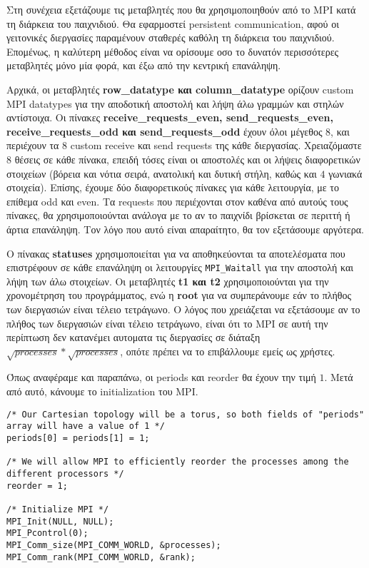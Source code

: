 \begin{multicols}{2}
Στη συνέχεια εξετάζουμε τις μεταβλητές που θα χρησιμοποιηθούν από το MPI κατά τη διάρκεια του παιχνιδιού. Θα εφαρμοστεί persistent communication, αφού οι γειτονικές διεργασίες παραμένουν σταθερές καθόλη τη διάρκεια του παιχνιδιού. Επομένως, η καλύτερη μέθοδος είναι να ορίσουμε οσο το δυνατόν περισσότερες μεταβλητές μόνο μία φορά, και έξω από την κεντρική επανάληψη. \par
Αρχικά, οι μεταβλητές \textbf{row\_datatype και column\_datatype} ορίζουν custom MPI datatypes για την αποδοτική αποστολή και λήψη άλω γραμμών και στηλών αντίστοιχα. Οι πίνακες \textbf{receive\_requests\_even, send\_requests\_even, receive\_requests\_odd και send\_requests\_odd} έχουν όλοι μέγεθος $8$, και περιέχουν τα 8 custom receive και send requests της κάθε διεργασίας. Χρειαζόμαστε $8$ θέσεις σε κάθε πίνακα, επειδή τόσες είναι οι αποστολές και οι λήψεις διαφορετικών στοιχείων (βόρεια και νότια σειρά, ανατολική και δυτική στήλη, καθώς και $4$ γωνιακά στοιχεία). Επίσης, έχουμε δύο διαφορετικούς πίνακες για κάθε λειτουργία, με το επίθεμα odd και even. Τα requests που περιέχονται στον καθένα από αυτούς τους πίνακες, θα χρησιμοποιούνται ανάλογα με το αν το παιχνίδι βρίσκεται σε περιττή ή άρτια επανάληψη. Τον λόγο που αυτό είναι απαραίτητο, θα τον εξετάσουμε αργότερα. \par
Ο πίνακας \textbf{statuses} χρησιμοποιείται για να αποθηκεύονται τα αποτελέσματα που επιστρέφουν σε κάθε επανάληψη οι λειτουργίες \texttt{MPI_Waitall} για την αποστολή και λήψη των άλω στοιχείων. Οι μεταβλητές \textbf{t1 και t2} χρησιμοποιούνται για την χρονομέτρηση του προγράμματος, ενώ η \textbf{root} για να συμπεράνουμε εάν το πλήθος των διεργασιών είναι τέλειο τετράγωνο. Ο λόγος που χρειάζεται να εξετάσουμε αν το πλήθος των διεργασιών είναι τέλειο τετράγωνο, είναι ότι το MPI σε αυτή την περίπτωση δεν κατανέμει αυτοματα τις διεργασίες σε διάταξη $\sqrt{processes} * \sqrt{processes}$, οπότε πρέπει να το επιβάλλουμε εμείς ως χρήστες.
\end{multicols}

\clearpage
Όπως αναφέραμε και παραπάνω, οι periods και reorder θα έχουν την τιμή $1$. Μετά από αυτό, κάνουμε το initialization του MPI.

\begin{tcolorbox}
\begin{verbatim}
/* Our Cartesian topology will be a torus, so both fields of "periods" array will have a value of 1 */
periods[0] = periods[1] = 1;

/* We will allow MPI to efficiently reorder the processes among the different processors */
reorder = 1;

/* Initialize MPI */
MPI_Init(NULL, NULL);
MPI_Pcontrol(0);
MPI_Comm_size(MPI_COMM_WORLD, &processes);
MPI_Comm_rank(MPI_COMM_WORLD, &rank);
\end{verbatim}
\end{tcolorbox}

